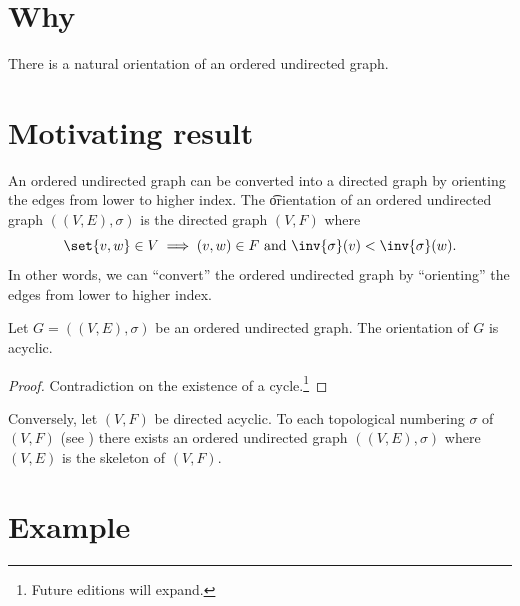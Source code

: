 

\section*{Why}

There is a natural orientation of an ordered undirected graph.

\section*{Motivating result}

An ordered undirected graph can be converted into a directed graph by orienting the edges from lower to higher index.
The \t{orientation} of an ordered undirected graph $((V, E),\sigma )$ is the directed graph $(V, F)$ where
\[
\set{v, w} \in V \implies (v, w) \in F \text{ and } \inv{\sigma }(v) < \inv{\sigma }(w).
\]
In other words, we can ``convert'' the ordered undirected graph by ``orienting'' the edges from lower to higher index.

\begin{proposition}
Let $G = ((V, E), \sigma )$ be an ordered undirected graph.
The orientation of $G$ is acyclic.
\begin{proof}Contradiction on the existence of a cycle.\footnote{Future editions will expand.}\end{proof}
\end{proposition}

Conversely, let $(V, F)$ be directed acyclic.
To each topological numbering $\sigma $ of $(V, F)$ (see ) there exists an ordered undirected graph $((V, E), \sigma )$ where $(V, E)$ is the skeleton of $(V, F)$.

\section*{Example}

